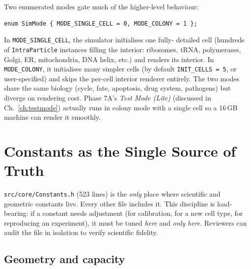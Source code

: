 \documentclass[11pt,letterpaper,twoside,openany]{book}
\newcommand{\code}[1]{\texttt{#1}}
\newcommand{\file}[1]{\texttt{\small#1}}
\begin{document}
Two enumerated modes gate much of the higher-level behaviour:
\begin{lstlisting}
enum SimMode { MODE_SINGLE_CELL = 0, MODE_COLONY = 1 };
\end{lstlisting}
In \code{MODE\_SINGLE\_CELL}, the simulator initialises one fully-
detailed cell (hundreds of \code{IntraParticle} instances filling
the interior: ribosomes, tRNA, polymerases, Golgi, ER, mitochondria,
DNA helix, etc.) and renders its interior. In \code{MODE\_COLONY}, it
initialises many simpler cells (by default \code{INIT\_CELLS = 5}, or
user-specified) and skips the per-cell interior renderer entirely.
The two modes share the same biology (cycle, fate, apoptosis, drug
system, pathogens) but diverge on rendering cost. Phase 7A's
\emph{Test Mode (Lite)} (discussed in Ch.~\ref{ch:testmode}) actually
runs in colony mode with a single cell so a 16\,GB machine can render
it smoothly.

\chapter{Constants as the Single Source of Truth}
\label{ch:constants}

\file{src/core/Constants.h} (523 lines) is the \emph{only} place
where scientific and geometric constants live. Every other file
includes it. This discipline is load-bearing: if a constant needs
adjustment (for calibration, for a new cell type, for reproducing
an experiment), it must be tuned \emph{here} and \emph{only here}.
Reviewers can audit the file in isolation to verify scientific
fidelity.

\section{Geometry and capacity}
\end{document}
